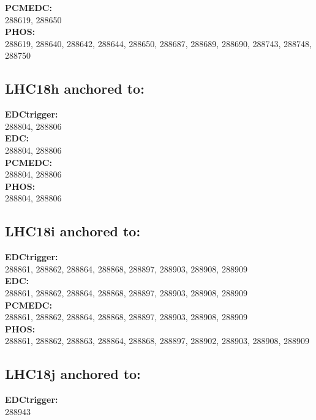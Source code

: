  \textbf{PCMEDC:}\\
 288619, 288650 \\

 \textbf{PHOS:}\\
288619, 288640, 288642, 288644, 288650, 288687, 288689, 288690, 288743, 288748, 288750\\

 \subsection{LHC18h anchored to:  }

 \textbf{EDCtrigger:}\\
 288804, 288806\\

 \textbf{EDC:}\\
 288804, 288806\\

 \textbf{PCMEDC:}\\
288804, 288806\\

 \textbf{PHOS:}\\
288804, 288806\\

 \subsection{LHC18i anchored to:  }

 \textbf{EDCtrigger:}\\
  288861, 288862, 288864, 288868, 288897, 288903, 288908, 288909\\

 \textbf{EDC:}\\
 288861, 288862, 288864, 288868, 288897, 288903, 288908, 288909\\

 \textbf{PCMEDC:}\\
288861, 288862, 288864, 288868, 288897, 288903, 288908, 288909 \\

 \textbf{PHOS:}\\
288861, 288862, 288863, 288864, 288868, 288897, 288902, 288903, 288908, 288909\\

 \subsection{LHC18j anchored to:  }

 \textbf{EDCtrigger:}\\
 288943\\

